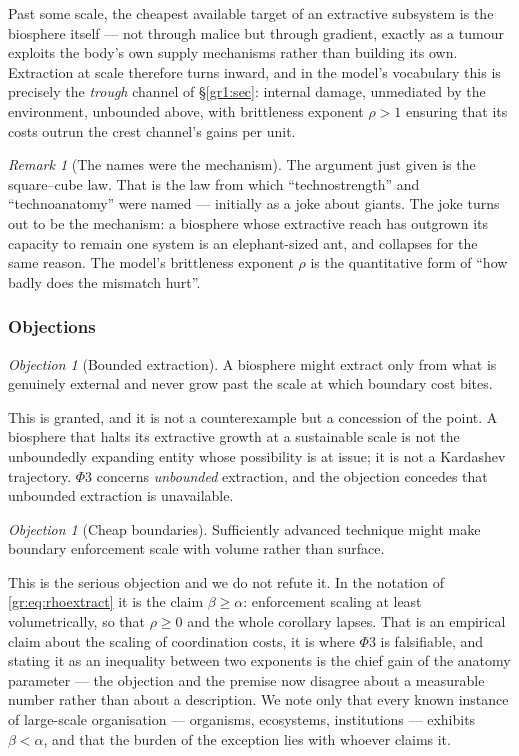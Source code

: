 \documentclass[11pt]{article}
\numberwithin{equation}{section}
\theoremstyle{plain}
\theoremstyle{definition}
\theoremstyle{remark}
\newtheorem{remark}[theorem]{Remark}
\newtheorem{objection}[theorem]{Objection}
\begin{document}
Past some scale, the cheapest available target of an extractive
subsystem is the biosphere itself --- not through malice but through
gradient, exactly as a tumour exploits the body's own supply mechanisms
rather than building its own. Extraction at scale therefore turns
inward, and in the model's vocabulary this is precisely the
\emph{trough} channel of \S\ref{gr1:sec}: internal damage, unmediated by the
environment, unbounded above, with brittleness exponent $\rho>1$
ensuring that its costs outrun the crest channel's gains per unit.

\begin{remark}[The names were the mechanism]\label{gr:rem:namesclosure}
The argument just given is the square--cube law. That is the law from
which ``technostrength'' and ``technoanatomy'' were named --- initially
as a joke about giants. The joke turns out to be the mechanism: a
biosphere whose extractive reach has outgrown its capacity to remain one
system is an elephant-sized ant, and collapses for the same reason. The
model's brittleness exponent $\rho$ is the quantitative form of ``how
badly does the mismatch hurt''.
\end{remark}

\subsubsection{Objections}\label{gr:subsub:objections}

\begin{objection}[Bounded extraction]\label{gr:obj:bounded}
A biosphere might extract only from what is genuinely external and never
grow past the scale at which boundary cost bites.
\end{objection}

\noindent This is granted, and it is not a counterexample but a
concession of the point. A biosphere that halts its extractive growth at
a sustainable scale is not the unboundedly expanding entity whose
possibility is at issue; it is not a Kardashev trajectory. $\Phi3$
concerns \emph{unbounded} extraction, and the objection concedes that
unbounded extraction is unavailable.

\begin{objection}[Cheap boundaries]\label{gr:obj:cheap}
Sufficiently advanced technique might make boundary enforcement scale
with volume rather than surface.
\end{objection}

\noindent This is the serious objection and we do not refute it. In the
notation of \eqref{gr:eq:rhoextract} it is the claim $\beta\ge\alpha$:
enforcement scaling at least volumetrically, so that $\rho\ge0$ and the
whole corollary lapses. That is an empirical claim about the scaling of
coordination costs, it is where $\Phi3$ is falsifiable, and stating it
as an inequality between two exponents is the chief gain of the anatomy
parameter --- the objection and the premise now disagree about a
measurable number rather than about a description. We note only that
every known instance of large-scale organisation --- organisms,
ecosystems, institutions --- exhibits $\beta<\alpha$, and that the
burden of the exception lies with whoever claims it.
\end{document}
